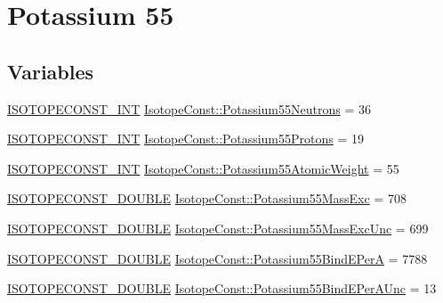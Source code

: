\hypertarget{group___isotope_const-_potassium-_k55}{}\section{Potassium 55}
\label{group___isotope_const-_potassium-_k55}
\subsection*{Variables}
\begin{DoxyCompactItemize}
\item 
\mbox{\hyperlink{group___isotope_const-_macros_ga5f18360b3e99483a35c32d789e62621c}{I\+S\+O\+T\+O\+P\+E\+C\+O\+N\+S\+T\+\_\+\+I\+NT}} \mbox{\hyperlink{group___isotope_const-_potassium-_k55_ga13f69714aafec112d8a2173e913e4623}{Isotope\+Const\+::\+Potassium55\+Neutrons}} = 36
\item 
\mbox{\hyperlink{group___isotope_const-_macros_ga5f18360b3e99483a35c32d789e62621c}{I\+S\+O\+T\+O\+P\+E\+C\+O\+N\+S\+T\+\_\+\+I\+NT}} \mbox{\hyperlink{group___isotope_const-_potassium-_k55_gafe448caa9b75f77b5df25a3e3f2806bf}{Isotope\+Const\+::\+Potassium55\+Protons}} = 19
\item 
\mbox{\hyperlink{group___isotope_const-_macros_ga5f18360b3e99483a35c32d789e62621c}{I\+S\+O\+T\+O\+P\+E\+C\+O\+N\+S\+T\+\_\+\+I\+NT}} \mbox{\hyperlink{group___isotope_const-_potassium-_k55_gada1b8412e1e6a36a7f31872a49c065b3}{Isotope\+Const\+::\+Potassium55\+Atomic\+Weight}} = 55
\item 
\mbox{\hyperlink{group___isotope_const-_macros_ga8f45a7272ce02c0b4c65c44636ed719a}{I\+S\+O\+T\+O\+P\+E\+C\+O\+N\+S\+T\+\_\+\+D\+O\+U\+B\+LE}} \mbox{\hyperlink{group___isotope_const-_potassium-_k55_ga36f994c515f80f7f4156bab9cda7f0a6}{Isotope\+Const\+::\+Potassium55\+Mass\+Exc}} = 708
\item 
\mbox{\hyperlink{group___isotope_const-_macros_ga8f45a7272ce02c0b4c65c44636ed719a}{I\+S\+O\+T\+O\+P\+E\+C\+O\+N\+S\+T\+\_\+\+D\+O\+U\+B\+LE}} \mbox{\hyperlink{group___isotope_const-_potassium-_k55_ga0e83bf3a0466b4b019f7c97614e65a07}{Isotope\+Const\+::\+Potassium55\+Mass\+Exc\+Unc}} = 699
\item 
\mbox{\hyperlink{group___isotope_const-_macros_ga8f45a7272ce02c0b4c65c44636ed719a}{I\+S\+O\+T\+O\+P\+E\+C\+O\+N\+S\+T\+\_\+\+D\+O\+U\+B\+LE}} \mbox{\hyperlink{group___isotope_const-_potassium-_k55_ga9486052816958650a013e53627307e7b}{Isotope\+Const\+::\+Potassium55\+Bind\+E\+PerA}} = 7788
\item 
\mbox{\hyperlink{group___isotope_const-_macros_ga8f45a7272ce02c0b4c65c44636ed719a}{I\+S\+O\+T\+O\+P\+E\+C\+O\+N\+S\+T\+\_\+\+D\+O\+U\+B\+LE}} \mbox{\hyperlink{group___isotope_const-_potassium-_k55_ga7bf28e501c71c6fc1ed6ba8553d3ce62}{Isotope\+Const\+::\+Potassium55\+Bind\+E\+Per\+A\+Unc}} = 13

\end{DoxyCompactItemize}
